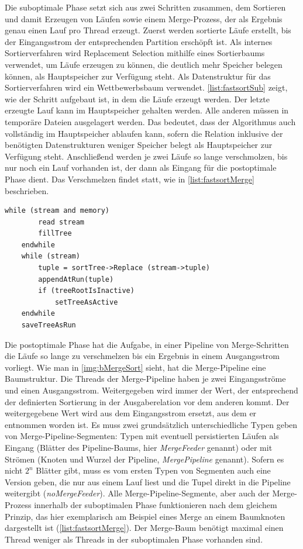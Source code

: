 \documentclass[a4paper,12pt,twoside]{article}
\newcommand{\Fb}[1]{\textit{#1}} %
\begin{document}
Die suboptimale Phase setzt sich aus zwei Schritten zusammen, dem Sortieren und damit Erzeugen von Läufen sowie einem Merge-Prozess, der als Ergebnis genau einen Lauf pro Thread erzeugt. Zuerst werden sortierte Läufe erstellt, bis der Eingangsstrom der entsprechenden Partition erschöpft ist. Als internes Sortierverfahren wird Replacement Selection mithilfe eines Sortierbaums verwendet, um Läufe erzeugen zu können, die deutlich mehr Speicher belegen können, als Hauptspeicher zur Verfügung steht. Als Datenstruktur für das Sortierverfahren wird ein Wettbewerbsbaum verwendet. \autoref{list:fastsortSub} zeigt, wie der Schritt aufgebaut ist, in dem die Läufe erzeugt werden. Der letzte erzeugte Lauf kann im Hauptspeicher gehalten werden. Alle anderen müssen in temporäre Dateien ausgelagert werden. Das bedeutet, dass der Algorithmus auch vollständig im Hauptspeicher ablaufen kann, sofern die Relation inklusive der benötigten Datenstrukturen weniger Speicher belegt als Hauptspeicher zur Verfügung steht. Anschließend werden je zwei Läufe so lange verschmolzen, bis nur noch ein Lauf vorhanden ist, der dann als Eingang für die postoptimale Phase dient. Das Verschmelzen findet statt, wie in  \autoref{list:fastsortMerge} beschrieben.

\begin{minipage}{\linewidth}
	\begin{lstlisting}[caption={Fastsort: Erzeugen der Runs in der Suboptimalen Phase}, label=list:fastsortSub] 
	while (stream and memory) 
		read stream
		fillTree
	endwhile
	while (stream)
		tuple = sortTree->Replace (stream->tuple)
		appendAtRun(tuple)
		if (treeRootIsInactive)
			setTreeAsActive
	endwhile
	saveTreeAsRun
	\end{lstlisting}
\end{minipage}

Die postoptimale Phase hat die Aufgabe, in einer Pipeline von Merge-Schritten die Läufe so lange zu verschmelzen bis ein Ergebnis in einem Ausgangsstrom vorliegt. Wie man in \autoref{img:bMergeSort} sieht, hat die Merge-Pipeline eine Baumstruktur. Die Threads der Merge-Pipeline haben je zwei Eingangsströme und einen Ausgangsstrom. Weitergegeben wird immer der Wert, der entsprechend der definierten Sortierung in der Ausgaberelation vor dem anderen kommt. Der weitergegebene Wert wird aus dem Eingangsstrom ersetzt, aus dem er entnommen worden ist. Es muss zwei grundsätzlich unterschiedliche Typen geben von Merge-Pipeline-Segmenten: Typen mit eventuell persistierten Läufen als Eingang (Blätter des Pipeline-Baums, hier \Fb{MergeFeeder} genannt) oder mit Strömen (Knoten und Wurzel der Pipeline, \Fb{MergePipeline} genannt). Sofern es nicht $2^n$ Blätter gibt, muss es vom ersten Typen von Segmenten auch eine Version geben, die nur aus einem Lauf liest und die Tupel direkt in die Pipeline weitergibt (\Fb{noMergeFeeder}). Alle Merge-Pipeline-Segmente, aber auch der Merge-Prozess innerhalb der suboptimalen Phase funktionieren nach dem gleichem Prinzip, das hier exemplarisch am Beispiel eines Merge an einem Baumknoten dargestellt ist (\autoref{list:fastsortMerge}). Der Merge-Baum benötigt maximal einen Thread weniger als Threads in der suboptimalen Phase vorhanden sind.
\end{document}
